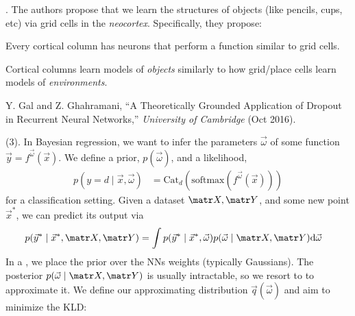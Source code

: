 \documentclass[11pt]{article}
\begin{document}
\myspace{}
\p {}. The authors propose that we learn the structures of objects (like pencils, cups, etc) via grid cells in the \textit{neocortex}. Specifically, they propose:
\begin{compactenum}
	\item Every cortical column has neurons that perform a function similar to grid cells.
	
	\item Cortical columns learn models of \textit{objects} similarly to how grid/place cells learn models of \textit{environments}.
\end{compactenum}





\vspace{-1em}
{\footnotesize Y. Gal and Z. Ghahramani, ``A Theoretically Grounded Application of Dropout in Recurrent Neural Networks,'' \textit{University of Cambridge} (Oct 2016).}

\p {} (3). In Bayesian regression, we want to infer the parameters $\vec \omega$ of some function $\vec y = f^{\vec \omega}(\vec x)$. We define a prior, $p(\vec \omega)$, and a likelihood,
\begin{align}
	p(y{=}d \mid \vec x , \vec \omega)
		&= \text{Cat}_d\left(
			\text{softmax}\left(
				f^{\vec \omega}(\vec x)
			\right)
		\right)
\end{align}
for a classification setting. Given a dataset $\matr X, \matr Y$, and some new point $\vec{x}^*$, we can predict its output via
\begin{align}
	p(\vec{y}^* \mid \vec{x}^*, \matr X, \matr Y)
		&= \int p(\vec{y}^* \mid \vec{x}^*, \vec \omega) p(\vec \omega \mid \matr X, \matr Y) \mathrm{d}\vec\omega 
\end{align}
In a , we place the prior over the NNs weights (typically Gaussians). The posterior $p(\vec \omega \mid \matr X, \matr Y)$ is usually intractable, so we resort to  to approximate it. We define our approximating distribution $\vec q (\vec \omega)$ and aim to minimize the KLD:
\end{document}
